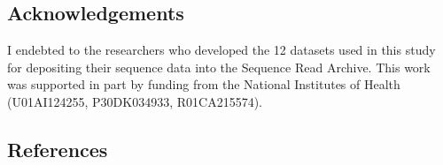 \documentclass[
]{article}
\begin{document}
\hypertarget{acknowledgements}{%
\subsection{Acknowledgements}\label{acknowledgements}}

I endebted to the researchers who developed the 12 datasets used in this
study for depositing their sequence data into the Sequence Read Archive.
This work was supported in part by funding from the National Institutes
of Health (U01AI124255, P30DK034933, R01CA215574).

\newpage

\hypertarget{references}{%
\subsection{References}\label{references}}
\end{document}
